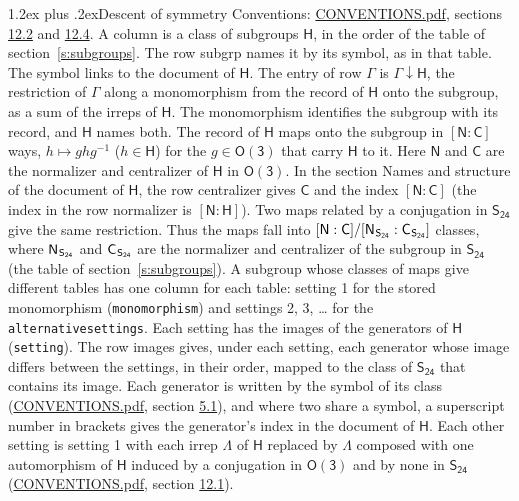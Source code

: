 \documentclass[10pt,a4paper]{article}
\makeatletter
\renewcommand\section{\@startsection{section}{1}{\z@}{-3ex plus -1ex minus -.2ex}%
  {1.2ex plus .2ex}{\normalfont\large\sffamily\bfseries\color{parttitle}}}
\numberwithin{equation}{section}
\newcommand{\grp}[1]{\mathsf{#1}}
\newcommand{\grpindex}[2]{[#1 : #2]}
\newcommand{\restr}[2]{#1\!\downarrow#2}
\newcommand{\hairsp}{\mkern1mu}
\makeatother
\begin{document}
\section{Descent of symmetry}\label{s:subduction}
Conventions: \href{../../CONVENTIONS.pdf}{CONVENTIONS.pdf}, sections \href{../../CONVENTIONS.pdf\#conv.12.2}{12.2} and \href{../../CONVENTIONS.pdf\#conv.12.4}{12.4}.
A column is a class of subgroups $\grp{H}$, in the order of the table of section~\ref{s:subgroups}. The row subgrp names it by its symbol, as in that table. The symbol links to the document of $\grp{H}$. The entry of row $\Gamma$ is $\restr{\Gamma}{\grp{H}}$, the restriction of $\Gamma$ along a monomorphism from the record of $\grp{H}$ onto the subgroup, as a sum of the irreps of $\grp{H}$. The monomorphism identifies the subgroup with its record, and $\grp{H}$ names both. \label{n:group.normalizer.o3}\label{n:group.centralizer.o3}The record of $\grp{H}$ maps onto the subgroup in $\grpindex{\grp{N}}{\grp{C}}$ ways, $h \mapsto g h g^{-1}$ ($h \in \grp{H}$) for the $g \in \grp{O(3)}$ that carry $\grp{H}$ to it. Here $\grp{N}$ and $\grp{C}$ are the normalizer and centralizer of $\grp{H}$ in \href{O3.pdf}{$\grp{O(3)}$}. In the section Names and structure of the document of $\grp{H}$, the row centralizer gives $\grp{C}$ and the index $\grpindex{\grp{N}}{\grp{C}}$ (the index in the row normalizer is $\grpindex{\grp{N}}{\grp{H}}$). Two maps related by a conjugation in $\grp{S_{24}}$ give the same restriction. Thus the maps fall into $\grpindex{\grp{N}}{\grp{C}}/\grpindex{\grp{N}_{\hairsp \grp{S_{24}}}}{\grp{C}_{\hairsp \grp{S_{24}}}}$ classes, where $\grp{N}_{\hairsp \grp{S_{24}}}$ and $\grp{C}_{\hairsp \grp{S_{24}}}$ are the normalizer and centralizer of the subgroup in $\grp{S_{24}}$ (the table of section~\ref{s:subgroups}). \label{n:head.setting}A subgroup whose classes of maps give different tables has one column for each table: setting 1 for the stored monomorphism (\texttt{monomorphism}) and settings 2, 3, \dots{} for the \texttt{alternativesettings}. Each setting has the images of the generators of $\grp{H}$ (\texttt{setting}). \label{n:head.images}The row images gives, under each setting, each generator whose image differs between the settings, in their order, mapped to the class of $\grp{S_{24}}$ that contains its image. Each generator is written by the symbol of its class (\href{../../CONVENTIONS.pdf}{CONVENTIONS.pdf}, section \href{../../CONVENTIONS.pdf\#conv.5.1}{5.1}), and where two share a symbol, a superscript number in brackets gives the generator's index in the document of $\grp{H}$. \label{n:irrep.Delta}Each other setting is setting 1 with each irrep $\Lambda$ of $\grp{H}$ replaced by $\Lambda$ composed with one automorphism of $\grp{H}$ induced by a conjugation in \href{O3.pdf}{$\grp{O(3)}$} and by none in $\grp{S_{24}}$ (\href{../../CONVENTIONS.pdf}{CONVENTIONS.pdf}, section \href{../../CONVENTIONS.pdf\#conv.12.1}{12.1}).
\end{document}
